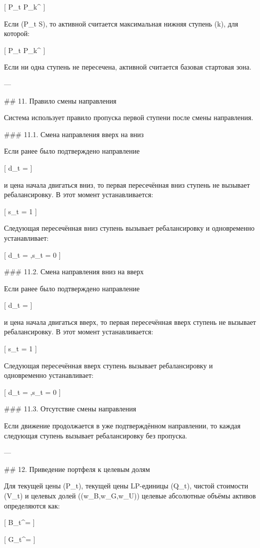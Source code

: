 [
P_t \ge P_k^{\uparrow}
]

Если (P_t \le S), то активной считается максимальная нижняя ступень (k), для которой:

[
P_t \le P_k^{\downarrow}
]

Если ни одна ступень не пересечена, активной считается базовая стартовая зона.

---

## 11. Правило смены направления

Система использует правило пропуска первой ступени после смены направления.

### 11.1. Смена направления вверх на вниз

Если ранее было подтверждено направление

[
d_t = \uparrow
]

и цена начала двигаться вниз, то первая пересечённая вниз ступень не вызывает ребалансировку. В этот момент устанавливается:

[
s_t = 1
]

Следующая пересечённая вниз ступень вызывает ребалансировку и одновременно устанавливает:

[
d_t = \downarrow,\qquad s_t = 0
]

### 11.2. Смена направления вниз на вверх

Если ранее было подтверждено направление

[
d_t = \downarrow
]

и цена начала двигаться вверх, то первая пересечённая вверх ступень не вызывает ребалансировку. В этот момент устанавливается:

[
s_t = 1
]

Следующая пересечённая вверх ступень вызывает ребалансировку и одновременно устанавливает:

[
d_t = \uparrow,\qquad s_t = 0
]

### 11.3. Отсутствие смены направления

Если движение продолжается в уже подтверждённом направлении, то каждая следующая ступень вызывает ребалансировку без пропуска.

---

## 12. Приведение портфеля к целевым долям

Для текущей цены (P_t), текущей цены LP-единицы (Q_t), чистой стоимости (V_t) и целевых долей ((w_B,w_G,w_U)) целевые абсолютные объёмы активов определяются как:

[
B_t^\star = 
]

[
G_t^\star = 
]

